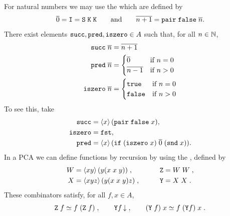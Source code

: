 %
For natural numbers we may use the
%
%
%
\label{sym:curry_numeral}%
%
 which are defined by 
%
\begin{equation*}
  \overline{0} = \mathtt{I} = \mathtt{S}\; \mathtt{K}\; \mathtt{K}
  \qquad\text{and}\qquad
  \overline{n+1} = \mathtt{pair} \; \mathtt{false} \; \overline{n}.
\end{equation*}
%
There exist elements
%
%
%
%
%
$\mathtt{succ}, \mathtt{pred}, \mathtt{iszero} \in A$ such that,
for all $n \in \mathbb{N}$,
%
\label{sym:succ}%
\label{sym:pred}%
\label{sym:iszero}%
%
\begin{align*}
  \mathtt{succ}\; \overline{n} &= \overline{n+1} \\
  \mathtt{pred}\; \overline{n} &= 
  \begin{cases}
    \overline{0} & \text{if $n = 0$} \\
    \overline{n-1} & \text{if $n > 0$}
  \end{cases}\\
  \mathtt{iszero}\; \overline{n} &=
  \begin{cases}
    \mathtt{true} & \text{if $n = 0$} \\
    \mathtt{false} & \text{if $n > 0$}
  \end{cases}
\end{align*}
%
To see this, take
%
\begin{align*}
  \mathtt{succ} &= \langle x \rangle\,(\mathtt{pair} \; \mathtt{false} \;x),\\ 
  \mathtt{iszero} &= \mathtt{fst},\\
  \mathtt{pred} &=
  \langle x \rangle\,(\mathtt{if}\; (\mathtt{iszero}\; x)\; \overline{0}\; (\mathtt{snd}\; x)).
\end{align*}
%
In a PCA we can define functions by recursion by using the
%
%
%
%
%
\label{sym:combY}%
\label{sym:combZ}%
\label{sym:combW}%
%
, defined by
%
\begin{alignat*}{2}
  W &= \langle x y \rangle\,(y(x\; x\; y))\;, &
  \qquad
  \mathtt{Z} &= W\; W \;, \\
  X &= \langle x y z \rangle\,(y (x\; x\; y) z) \;, &
  \qquad
  \mathtt{Y} &= X\; X \;.
\end{alignat*}
%
These combinators satisfy, for all $f, x \in A$,
%
\begin{equation*}
  \mathtt{Z}\; f \simeq f\; (\mathtt{Z}\; f) \;,
  \qquad
  \mathtt{Y} f\,{\downarrow} \;,
  \qquad
  (\mathtt{Y}\; f)\; x \simeq f\; (\mathtt{Y} f)\; x \;.
\end{equation*}

